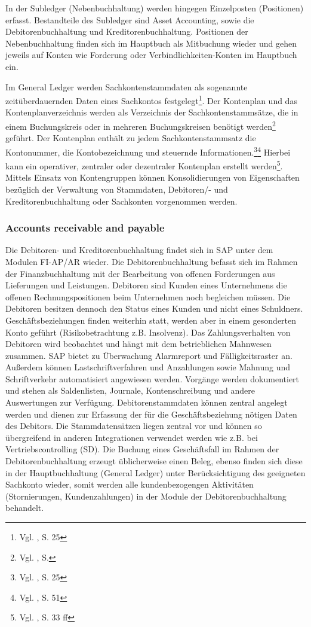 In der Subledger (Nebenbuchhaltung) werden hingegen Einzelposten (Positionen) erfasst. Bestandteile des Subledger sind Asset Accounting, sowie die Debitorenbuchhaltung und Kreditorenbuchhaltung. Positionen der Nebenbuchhaltung finden sich im Hauptbuch als Mitbuchung wieder und gehen jeweils auf Konten wie Forderung oder Verbindlichkeiten-Konten im Hauptbuch ein.

Im General Ledger werden Sachkontenstammdaten als sogenannte zeitüberdauernden Daten eines Sachkontos festgelegt\footnote{Vgl. \cite{SAPGL2001}, S. 25}. Der Kontenplan und das Kontenplanverzeichnis werden als Verzeichnis der \glqq […]Sachkontenstammsätze, die in einem Buchungskreis oder in mehreren Buchungskreisen benötigt werden\grqq \footnote{Vgl. \cite{SAPGL2001}, S. } geführt. \glqq Der Kontenplan enthält zu jedem Sachkontenstammsatz die Kontonummer, die Kontobezeichnung und steuernde Informationen.\grqq \footnote{Vgl. \cite{SAPFIGL}, S. 25}\footnote{Vgl. \cite{Schuler2006}, S. 51} Hierbei kann ein operativer, zentraler oder dezentraler Kontenplan erstellt werden\footnote{Vgl. \cite{SAPGL2001}, S. 33 ff}. Mittels Einsatz von Kontengruppen können Konsolidierungen von Eigenschaften bezüglich der Verwaltung von Stammdaten, Debitoren/- und Kreditorenbuchhaltung oder Sachkonten vorgenommen werden.


\subsubsection{Accounts receivable and payable} %
Die Debitoren- und Kreditorenbuchhaltung findet sich in SAP unter dem Modulen FI-AP/AR wieder.
Die Debitorenbuchhaltung befasst sich im Rahmen der Finanzbuchhaltung mit der Bearbeitung von offenen Forderungen aus Lieferungen und Leistungen. Debitoren sind Kunden eines Unternehmens die offenen Rechnungspositionen beim Unternehmen noch begleichen müssen. Die Debitoren besitzen dennoch den Status eines Kunden und nicht eines Schuldners. Geschäftsbeziehungen finden weiterhin statt, werden aber in einem gesonderten Konto geführt (Risikobetrachtung z.B. Insolvenz). Das Zahlungsverhalten von Debitoren wird beobachtet und hängt mit dem betrieblichen Mahnwesen zusammen. SAP bietet zu Überwachung Alarmreport und Fälligkeitsraster an. Außerdem können Lastschriftverfahren und Anzahlungen sowie Mahnung und Schriftverkehr automatisiert angewiesen werden. Vorgänge werden dokumentiert und stehen als Saldenlisten, Journale, Kontenschreibung und andere Auswertungen zur Verfügung. Debitorenstammdaten können zentral angelegt werden und dienen zur Erfassung der für die Geschäftsbeziehung nötigen Daten des Debitors. Die Stammdatensätzen liegen zentral vor und können so übergreifend in anderen Integrationen verwendet werden wie z.B. bei Vertriebscontrolling (SD). Die Buchung eines Geschäftsfall im Rahmen der Debitorenbuchhaltung erzeugt üblicherweise einen Beleg, ebenso finden sich diese in der Hauptbuchhaltung (General Ledger) unter Berücksichtigung des geeigneten Sachkonto wieder, somit werden alle kundenbezogengen Aktivitäten (Stornierungen, Kundenzahlungen) in der Module der Debitorenbuchhaltung behandelt. 

